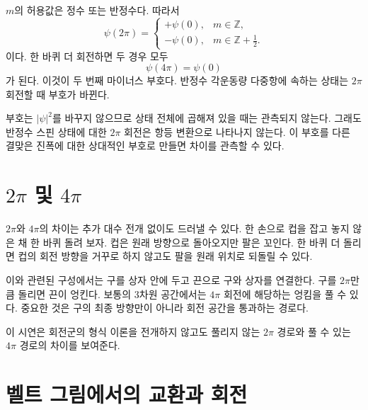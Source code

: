 \(m\)의 허용값은 정수 또는 반정수다. 따라서
\begin{equation}
\psi(2\pi)
=
\begin{cases}
+\psi(0), & m\in\mathbb Z,\\[4pt]
-\psi(0), & m\in\mathbb Z+\tfrac12.
\end{cases}
\end{equation}
이다. 한 바퀴 더 회전하면 두 경우 모두
\begin{equation}
\psi(4\pi)=\psi(0)
\end{equation}
가 된다. 이것이 두 번째 마이너스 부호다. 반정수 각운동량 다중항에 속하는 상태는 \(2\pi\) 회전할 때 부호가 바뀐다.

부호는 \(\lvert\psi\rvert^2\)를 바꾸지 않으므로 상태 전체에 곱해져 있을 때는 관측되지 않는다. 그래도 반정수 스핀 상태에 대한 \(2\pi\) 회전은 항등 변환으로 나타나지 않는다. 이 부호를 다른 결맞은 진폭에 대한 상대적인 부호로 만들면 차이를 관측할 수 있다.

\section{\texorpdfstring{\(2\pi\) 및 \(4\pi\)}{2파이 및 4파이 회전 경로}}

\(2\pi\)와 \(4\pi\)의 차이는 추가 대수 전개 없이도 드러낼 수 있다. 한 손으로 컵을 잡고 놓지 않은 채 한 바퀴 돌려 보자. 컵은 원래 방향으로 돌아오지만 팔은 꼬인다. 한 바퀴 더 돌리면 컵의 회전 방향을 거꾸로 하지 않고도 팔을 원래 위치로 되돌릴 수 있다.

이와 관련된 구성에서는 구를 상자 안에 두고 끈으로 구와 상자를 연결한다. 구를 \(2\pi\)만큼 돌리면 끈이 엉킨다. 보통의 3차원 공간에서는 \(4\pi\) 회전에 해당하는 엉킴을 풀 수 있다. 중요한 것은 구의 최종 방향만이 아니라 회전 공간을 통과하는 경로다.

\begin{classroomqa}
\end{classroomqa}

이 시연은 회전군의 형식 이론을 전개하지 않고도 풀리지 않는 \(2\pi\) 경로와 풀 수 있는 \(4\pi\) 경로의 차이를 보여준다.

\section{벨트 그림에서의 교환과 회전}

